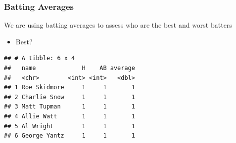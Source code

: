 \documentclass[
  shownotes,
  xcolor={svgnames},
  hyperref={colorlinks,citecolor=DarkBlue,linkcolor=DarkRed,urlcolor=DarkBlue}
  ]{beamer}
\begin{document}
\begin{frame}[fragile]
\frametitle{Batting Averages}

We are using batting averages to assess who are the best and worst batters
\begin{itemize}
  \item Best?
\end{itemize} 

\begin{small}
\begin{verbatim}
## # A tibble: 6 x 4
##   name             H    AB average
##   <chr>        <int> <int>   <dbl>
## 1 Roe Skidmore     1     1       1
## 2 Charlie Snow     1     1       1
## 3 Matt Tupman      1     1       1
## 4 Allie Watt       1     1       1
## 5 Al Wright        1     1       1
## 6 George Yantz     1     1       1
\end{verbatim}
\end{small}

\end{frame}
\end{document}
